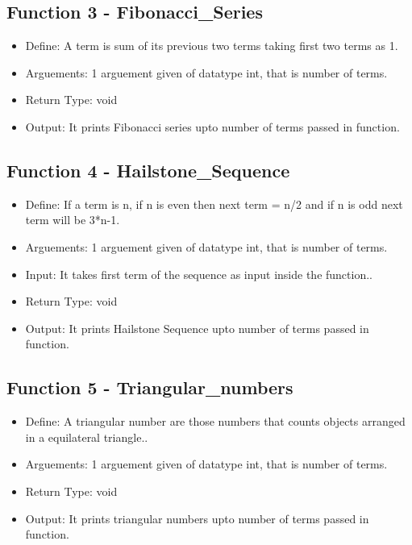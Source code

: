 \documentclass[12pt,a4paper]{article}
\begin{document}
\subsection*{Function 3 - Fibonacci\_Series}
\begin{itemize}
\item Define: A term is sum of its previous two terms taking first two terms as 1.
\item Arguements: 1 arguement given of datatype int, that is number of terms.
\item Return Type: void
\item Output: It prints Fibonacci series upto number of terms passed in function.
\end{itemize}


\subsection*{Function 4 - Hailstone\_Sequence}
\begin{itemize}
\item Define: If a term is n, if n is even then next term = n/2 and if n is odd next term will be 3*n-1.
\item Arguements: 1 arguement given of datatype int, that is number of terms.
\item Input: It takes first term of the sequence as input inside the function..
\item Return Type: void
\item Output: It prints Hailstone Sequence upto number of terms passed in function.
\end{itemize}

\subsection*{Function 5 - Triangular\_numbers}
\begin{itemize}
\item Define: A triangular number are those numbers that counts objects arranged in a equilateral triangle..
\item Arguements: 1 arguement given of datatype int, that is number of terms.
\item Return Type: void
\item Output: It prints triangular numbers upto number of terms passed in function.
\end{itemize}
\end{document}

